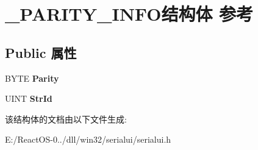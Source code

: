\hypertarget{struct___p_a_r_i_t_y___i_n_f_o}{}\section{\+\_\+\+P\+A\+R\+I\+T\+Y\+\_\+\+I\+N\+F\+O结构体 参考}
\label{struct___p_a_r_i_t_y___i_n_f_o}
\subsection*{Public 属性}
\begin{DoxyCompactItemize}
\item 
\mbox{\label{struct___p_a_r_i_t_y___i_n_f_o_afcd035ee0dce9020c6160aa4e44ab46c}} 
B\+Y\+TE {\bfseries Parity}
\item 
\mbox{\label{struct___p_a_r_i_t_y___i_n_f_o_afb17eb8b4c9f1a6e2ca4651e7da692b6}} 
U\+I\+NT {\bfseries Str\+Id}
\end{DoxyCompactItemize}


该结构体的文档由以下文件生成\+:\begin{DoxyCompactItemize}
\item 
E\+:/\+React\+O\+S-\/0../dll/win32/serialui/serialui.\+h\end{DoxyCompactItemize}
